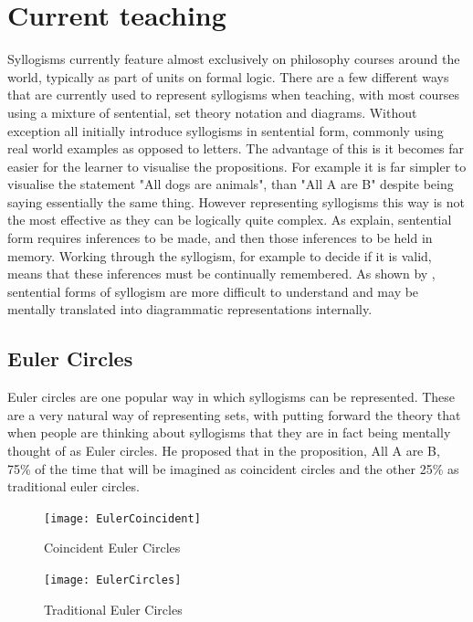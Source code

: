 \documentclass[12pt,a4paper]{report}
\begin{document}
\section{Current teaching}
Syllogisms currently feature almost exclusively on philosophy courses around the world, typically as part of units on formal logic. 
There are a few different ways that are currently used to represent syllogisms when teaching, with most courses using a mixture of sentential, set theory notation and diagrams. 
Without exception all initially introduce syllogisms in sentential form, commonly using real world examples as opposed to letters. The advantage of this is it becomes far easier for the learner to visualise the propositions. For example it is far simpler to visualise the statement "All dogs are animals", than "All A are B" despite being saying essentially the same thing. 
However representing syllogisms this way is not the most effective as they can be logically quite complex. As \citep{larkin1987diagram} explain, sentential form requires inferences to be made, and then those inferences to be held in memory. Working through the syllogism, for example to decide if it is valid, means that these inferences must be continually remembered. As shown by \cite{johnson1980mental}, sentential forms of syllogism are more difficult to understand and may be mentally translated into diagrammatic representations internally. 

\subsection{Euler Circles}
Euler circles are one popular way in which syllogisms can be represented. 
These are a very natural way of representing sets, with \cite{Erickson1978-ERIROS} putting forward the theory that when people are thinking about syllogisms that they are in fact being mentally thought of as Euler circles. He proposed that in the proposition, All A are B, 75\% of the time that will be imagined as coincident circles and the other 25\% as traditional euler circles.

\begin{figure}[!tbp]
  \centering
  \begin{minipage}[b]{0.4\textwidth}
    \texttt{[image: EulerCoincident]}
    \caption{Coincident Euler Circles }
  \end{minipage}
  \hfill
  \begin{minipage}[b]{0.4\textwidth}
    \texttt{[image: EulerCircles]}
    \caption{Traditional Euler Circles}
  \end{minipage}
\end{figure}
\end{document}
